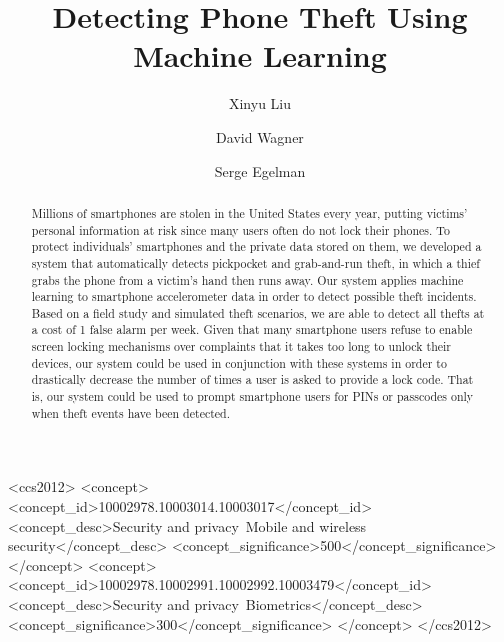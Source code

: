 \documentclass[sigconf]{acmart}
\begin{document}
\title{Detecting Phone Theft Using Machine Learning} %

\author{Xinyu Liu}
\author{David Wagner}
\author{Serge Egelman}

\begin{abstract}
Millions of smartphones are stolen in the United States every year, putting victims' personal information at risk since many users often do not lock their phones.
To protect individuals' smartphones and the private data stored on them, we developed a system that automatically detects pickpocket and grab-and-run theft, in which a thief grabs the phone from a victim's hand then runs away.
Our system applies machine learning to smartphone accelerometer data in order to detect possible theft incidents. Based on a field study and simulated theft scenarios, we are able to detect all thefts at a cost of 1 false alarm per week. Given that many smartphone users refuse to enable screen locking mechanisms over complaints that it takes too long to unlock their devices, our system could be used in conjunction with these systems in order to drastically decrease the number of times a user is asked to provide a lock code. That is, our system could be used to prompt smartphone users for PINs or passcodes only when theft events have been detected.
\end{abstract}

\begin{CCSXML}
<ccs2012>
<concept>
<concept_id>10002978.10003014.10003017</concept_id>
<concept_desc>Security and privacy~Mobile and wireless security</concept_desc>
<concept_significance>500</concept_significance>
</concept>
<concept>
<concept_id>10002978.10002991.10002992.10003479</concept_id>
<concept_desc>Security and privacy~Biometrics</concept_desc>
<concept_significance>300</concept_significance>
</concept>
</ccs2012>
\end{CCSXML}
\end{document}
